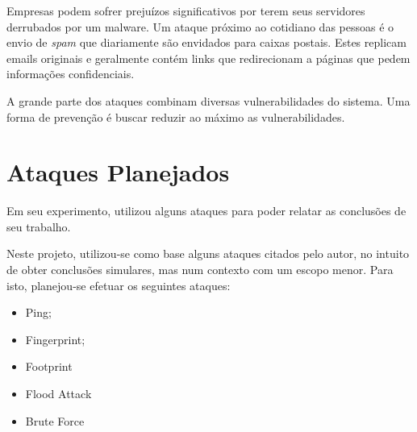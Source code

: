 		Empresas podem sofrer prejuízos significativos por terem seus servidores derrubados por um malware. Um ataque próximo ao cotidiano das pessoas é o envio de \textit{spam}  que diariamente são envidados para caixas postais. Estes replicam emails originais e geralmente contém links que redirecionam a páginas que pedem informações confidenciais. 

		A grande parte dos ataques combinam diversas vulnerabilidades do sistema.
		Uma forma de prevenção é buscar reduzir ao máximo as vulnerabilidades.


	\section{Ataques Planejados}
	\label{sec:Seguranca_Planejamento}

		Em seu experimento, \cite{Morais} utilizou alguns ataques para poder relatar as conclusões de seu trabalho.

		Neste projeto, utilizou-se como base alguns ataques citados pelo autor, no intuito de obter conclusões simulares, mas num contexto com um escopo menor. Para isto, planejou-se efetuar os seguintes ataques:

		\begin{itemize}
			\item Ping;
			\item Fingerprint;
			\item Footprint
			\item Flood Attack
			\item Brute Force
		\end{itemize} 

